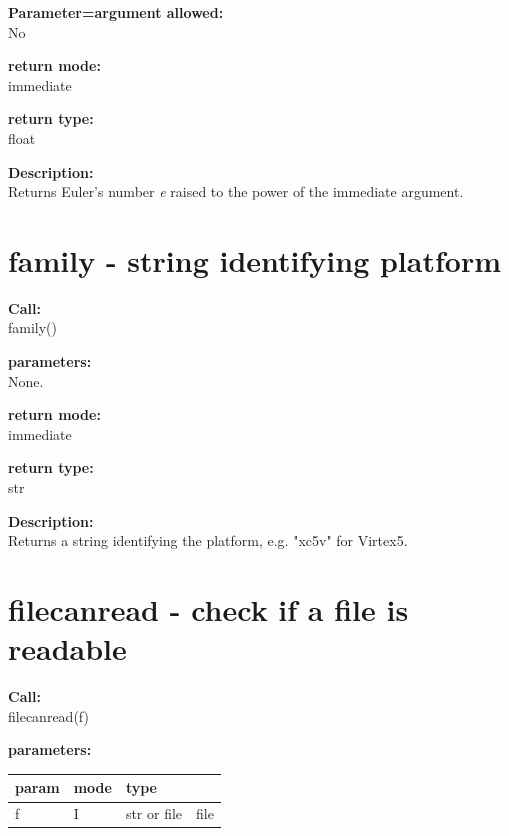         {\bf Parameter=argument allowed:} \\
        No
        
        {\bf return mode:} \\
        immediate

        {\bf return type:} \\
        float
        
        {\bf Description:} \\
        Returns Euler's number {\em e} raised to the power of the immediate
        argument.



    \section{family - string identifying platform}\label{sec:iffamily}
        
        {\bf Call:} \\
        family()
        
        {\bf parameters:} \\
        
        None.
        
        {\bf return mode:} \\
        immediate

        {\bf return type:} \\
        str
        
        {\bf Description:} \\
        Returns a string identifying the platform, e.g. "xc5v" for
        Virtex5.
 


    \section{filecanread - check if a file is readable}\label{sec:iffilecanread}
        
        {\bf Call:} \\
        filecanread(f)
        
        {\bf parameters:} \\
        \begin{tabular}{| l | l | l | l |}
        \hline
        param  & mode & type & \\
        \hline \hline
        f & I & str or file & file \\ \hline
        \end{tabular}
        
